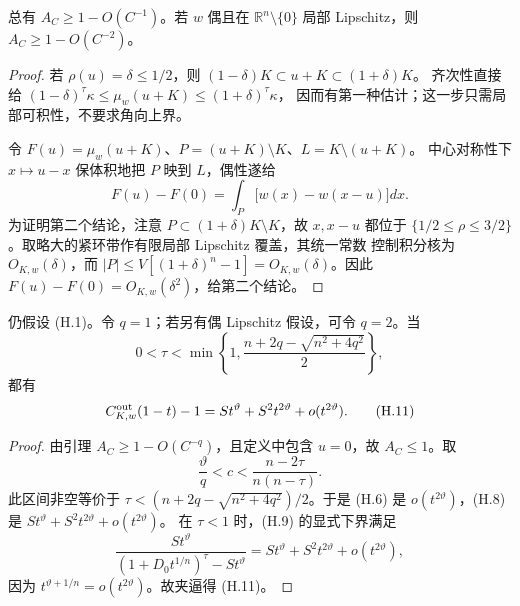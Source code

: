 \begin{lemma}[两种平移模量]\label{lem:hom-translation}
总有 $A_C\ge1-O(C^{-1})$。若 $w$ 偶且在
$\mathbb R^n\setminus\{0\}$ 局部 Lipschitz，则 $A_C\ge1-O(C^{-2})$。
\end{lemma}
\begin{proof}
若 $\rho(u)=\delta\le1/2$，则 $(1-\delta)K\subset u+K\subset(1+\delta)K$。
齐次性直接给
$(1-\delta)^\tau\kappa\le\mu_w(u+K)\le(1+\delta)^\tau\kappa$，
因而有第一种估计；这一步只需局部可积性，不要求角向上界。

令 $F(u)=\mu_w(u+K)$、$P=(u+K)\setminus K$、$L=K\setminus(u+K)$。
中心对称性下 $x\mapsto u-x$ 保体积地把 $P$ 映到 $L$，偶性遂给
\[
 F(u)-F(0)=\int_P\bigl[w(x)-w(x-u)\bigr]dx. \tag{H.10}
\]
为证明第二个结论，注意 $P\subset(1+\delta)K\setminus K$，故
$x,x-u$ 都位于 $\{1/2\le\rho\le3/2\}$。取略大的紧环带作有限局部 Lipschitz 覆盖，其统一常数
控制积分核为 $O_{K,w}(\delta)$，而
$|P|\le V[(1+\delta)^n-1]=O_{K,w}(\delta)$。因此
$F(u)-F(0)=O_{K,w}(\delta^2)$，给第二个结论。
\end{proof}

\begin{theorem}[二阶项的两个可证范围]\label{thm:hom-second}
仍假设 (H.1)。令 $q=1$；若另有偶 Lipschitz 假设，可令 $q=2$。当
\[
 0<\tau<\min\left\{1,\frac{n+2q-\sqrt{n^2+4q^2}}2\right\},
\]
都有
\[
 C^{\rm out}_{K,w}(1-t)-1=St^\vartheta+S^2t^{2\vartheta}+o(t^{2\vartheta}).\tag{H.11}
\]
\end{theorem}
\begin{proof}
由引理 $A_C\ge1-O(C^{-q})$，且定义中包含 $u=0$，故 $A_C\le1$。取
\[
 \frac\vartheta q<c<\frac{n-2\tau}{n(n-\tau)}. \tag{H.12}
\]
此区间非空等价于 $\tau<(n+2q-\sqrt{n^2+4q^2})/2$。于是 (H.6) 是
$o(t^{2\vartheta})$，(H.8) 是 $St^\vartheta+S^2t^{2\vartheta}+o(t^{2\vartheta})$。
在 $\tau<1$ 时，(H.9) 的显式下界满足
\[
 \frac{St^\vartheta}{(1+D_0t^{1/n})^\tau-St^\vartheta}
 =St^\vartheta+S^2t^{2\vartheta}+o(t^{2\vartheta}),
\]
因为 $t^{\vartheta+1/n}=o(t^{2\vartheta})$。故夹逼得 (H.11)。
\end{proof}

